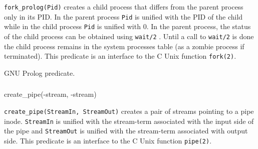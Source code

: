 \Description

\texttt{fork\_prolog(Pid)} creates a child process that differs from the parent
process only in its PID. In the parent process \texttt{Pid} is unified with
the PID of the child while in the child process \texttt{Pid} is unified with
0. In the parent process, the status of the child process can be obtained
using \texttt{wait/2} . Until a call to \texttt{wait/2} is done
the child process remains in the system processes table (as a zombie process
if terminated). This predicate is an interface to the C Unix function
\texttt{fork(2)}.

\begin{PlErrors}



\end{PlErrors}

\Portability

GNU Prolog predicate.

\subsubsection{}

\begin{TemplatesOneCol}
create\_pipe(-stream, -stream)

\end{TemplatesOneCol}

\Description

\texttt{create\_pipe(StreamIn, StreamOut)} creates  a  pair  of streams
pointing to a pipe inode. \texttt{StreamIn} is unified with the stream-term
associated with the input side of the pipe and \texttt{StreamOut} is unified
with the stream-term associated with output side. This predicate is an
interface to the C Unix function \texttt{pipe(2)}.

\begin{PlErrors}




\end{PlErrors}

